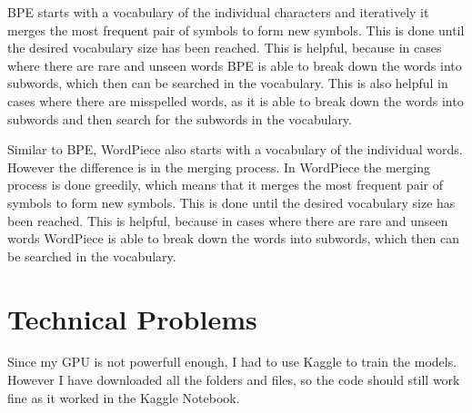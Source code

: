 \documentclass[a4paper]{article}
\begin{document}
BPE starts with a vocabulary of the individual characters and iteratively it merges the most frequent pair of symbols to form new symbols. This is done until the desired vocabulary size has been reached. This is helpful, because in cases where there are rare and unseen words BPE is able to break down the words into subwords, which then can be searched in the vocabulary. This is also helpful in cases where there are misspelled words, as it is able to break down the words into subwords and then search for the subwords in the vocabulary.

Similar to BPE, WordPiece also starts with a vocabulary of the individual words. However the difference is in the merging process. In WordPiece the merging process is done greedily, which means that it merges the most frequent pair of symbols to form new symbols. This is done until the desired vocabulary size has been reached. This is helpful, because in cases where there are rare and unseen words WordPiece is able to break down the words into subwords, which then can be searched in the vocabulary.


\section{Technical Problems}
Since my GPU is not powerfull enough, I had to use Kaggle to train the models. However I have downloaded all the folders and files, so the code should still work fine as it worked in the Kaggle Notebook.
\end{document}
